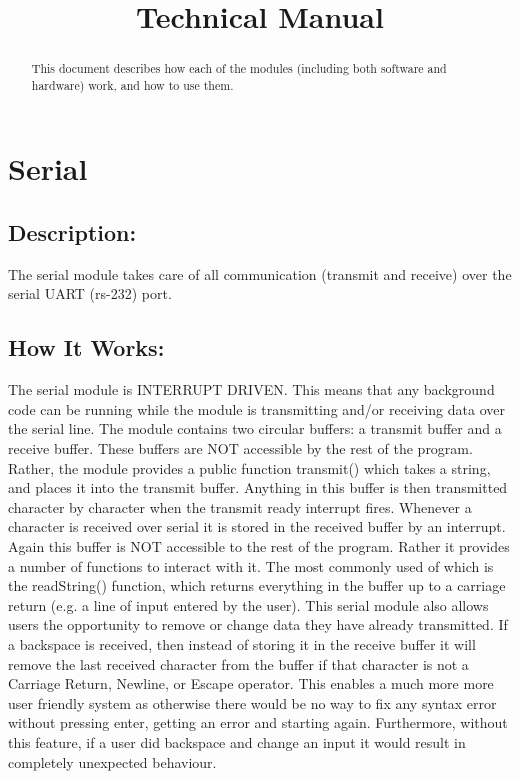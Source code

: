 \documentclass[]{report}
\title{Technical Manual}
\author{}
\begin{document}
\maketitle

\begin{abstract}
	This document describes how each of the modules (including both software and hardware) work, and how to use them.
\end{abstract}

\chapter{Serial}
\section{Description:}
The serial module takes care of all communication (transmit and receive) over the serial UART (rs-232) port.

\section{How It Works:}
The serial module is INTERRUPT DRIVEN. This means that any background code can be running while the module is transmitting and/or receiving data over the serial line. \newline
The module contains two circular buffers: a transmit buffer and a receive buffer. These buffers are NOT accessible by the rest of the program. Rather, the module provides a public function transmit() which takes a string, and places it into the transmit buffer. Anything in this buffer is then transmitted character by character when the transmit ready interrupt fires. \newline
Whenever a character is received over serial it is stored in the received buffer by an interrupt. Again this buffer is NOT accessible to the rest of the program. Rather it provides a number of functions to interact with it. The most commonly used of which is the readString() function, which returns everything in the buffer up to a carriage return (e.g. a line of input entered by the user). \newline
This serial module also allows users the opportunity to remove or change data they have already transmitted. If a backspace is received, then instead of storing it in the receive buffer it will remove the last received character from the buffer if that character is not a Carriage Return, Newline, or Escape operator. This enables a much more more user friendly system as otherwise there would be no way to fix any syntax error without pressing enter, getting an error and starting again. Furthermore, without this feature, if a user did backspace and change an input it would result in completely unexpected behaviour.
\end{document}
